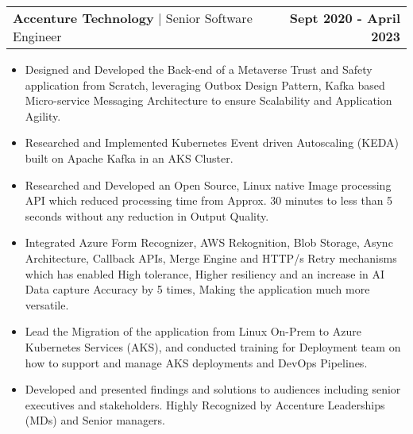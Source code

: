 \documentclass[a4paper,12pt]{article}
\makeatletter
\newenvironment{joblong}[3]
    {
    \begin{tabularx}{\linewidth}{@{}l X r@{}}
    \textbf{#1} | #2 & \hfill &  \textbf{#3} \\[3.75pt]
    \end{tabularx}
    \begin{minipage}[t]{\linewidth}
    \begin{itemize}[nosep,after=\strut, leftmargin=1em, itemsep=3pt,label=-]
    }
    {
    \end{itemize}
    \end{minipage}    
    }
\makeatother
\begin{document}
\begin{joblong}{Accenture Technology}{Senior Software Engineer}{Sept 2020 - April 2023}

\item Designed and Developed the Back-end of a Metaverse Trust and Safety application from Scratch, leveraging Outbox Design Pattern, Kafka based Micro-service Messaging Architecture to ensure Scalability and Application Agility.
\item Researched and Implemented Kubernetes Event driven Autoscaling (KEDA) built on Apache Kafka in an AKS Cluster.
\item Researched and Developed an Open Source, Linux native Image processing API which reduced processing time from Approx. 30 minutes to less than 5 seconds without any reduction in Output Quality.
\item Integrated Azure Form Recognizer, AWS Rekognition, Blob Storage, Async Architecture, Callback APIs, Merge Engine and HTTP/s Retry mechanisms which has enabled High tolerance, Higher resiliency and an increase in AI Data capture Accuracy by 5 times, Making the application much more versatile.
\item Lead the Migration of the application from Linux On-Prem to Azure Kubernetes Services (AKS), and conducted training for Deployment team on how to support and manage AKS deployments and DevOps Pipelines.
\item Developed and presented findings and solutions to audiences including senior executives and stakeholders. Highly Recognized by Accenture Leaderships (MDs) and Senior managers.

\end{joblong}



\end{document}
